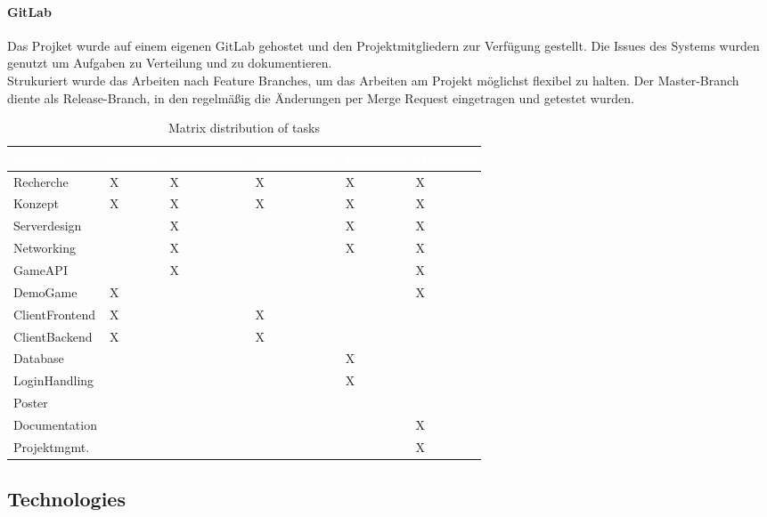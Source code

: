 \documentclass[a4paper]{spie}  %
\begin{document}
\paragraph{GitLab}
Das Projket wurde auf einem eigenen GitLab gehostet und den Projektmitgliedern zur Verfügung gestellt. Die Issues des Systems wurden genutzt um Aufgaben zu Verteilung und zu dokumentieren.\\
Strukuriert wurde das Arbeiten nach Feature Branches, um das Arbeiten am Projekt möglichst flexibel zu halten. Der Master-Branch diente als Release-Branch, in den regelmäßig die Änderungen per Merge Request eingetragen und getestet wurden.
\begin{table}
	\label{table:distribution of tasks}
	\centering
		\caption{Matrix distribution of tasks}
		\begin{tabular}{| L{2.6cm} | C{2cm} | C{2cm} | C{2cm} | C{2cm} | C{2cm} |}
		\hline
		\textcolor{white}{\textbf{Aufgabe}} & \textcolor{white}{\textbf{Schleiss}} & \textcolor{white}{\textbf{Grothknopf}} & \textcolor{white}{\textbf{Schiwkowksi}} & \textcolor{white}{\textbf{Hofmann}} & \textcolor{white}{\textbf{Heinrichs}}\\\hline
		Recherche 		& X & X	& X	& X	& X	\\\hline
		Konzept 		& X & X	& X	& X	& X	\\\hline
		Serverdesign	& 	& X & 	& X	& X \\\hline
		Networking		& 	& X	& 	& X	& X	\\\hline
		GameAPI 		& 	& X	&	&	& X	\\\hline
		DemoGame 		& X	&	&	&	& X	\\\hline
		ClientFrontend 	& X	&	& X	&	&	\\\hline
		ClientBackend 	& X	&	& X	&	&	\\\hline
		Database 	    & 	&	&	& X	& 	\\\hline
		LoginHandling   & 	& 	& 	& X	& 	\\\hline
		Poster          & 	& 	& 	& 	& 	\\\hline
		Documentation   & 	& 	& 	& 	& X \\\hline
		Projektmgmt. 	&	&	&	& 	& X	\\\hline
	\end{tabular} 
\end{table}

\subsection{Technologies}
\end{document}
